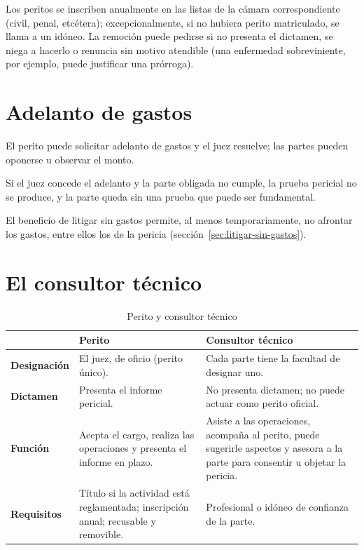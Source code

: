 \documentclass[12pt,oneside]{book}
\begin{document}
Los peritos se inscriben anualmente en las listas de la cámara correspondiente (civil, penal, etcétera); excepcionalmente, si no hubiera perito matriculado, se llama a un idóneo. La remoción puede pedirse si no presenta el dictamen, se niega a hacerlo o renuncia sin motivo atendible (una enfermedad sobreviniente, por ejemplo, puede justificar una prórroga).

\section{Adelanto de gastos}

El perito puede solicitar adelanto de gastos y el juez resuelve; las partes pueden oponerse u observar el monto.

\begin{importante}
Si el juez concede el adelanto y la parte obligada no cumple, la prueba pericial no se produce, y la parte queda sin una prueba que puede ser fundamental.
\end{importante}

El beneficio de litigar sin gastos permite, al menos temporariamente, no afrontar los gastos, entre ellos los de la pericia (sección~\ref{sec:litigar-sin-gastos}).

\section{El consultor técnico}

\begin{table}[H]
\centering
\caption{Perito y consultor técnico}
\begin{tabularx}{\textwidth}{>{\raggedright\arraybackslash\bfseries}p{} X X}
\toprule
 & Perito & Consultor técnico \\
\midrule
Designación & El juez, de oficio (perito único). & Cada parte tiene la facultad de designar uno. \\
Dictamen & Presenta el informe pericial. & No presenta dictamen; no puede actuar como perito oficial. \\
Función & Acepta el cargo, realiza las operaciones y presenta el informe en plazo. & Asiste a las operaciones, acompaña al perito, puede sugerirle aspectos y asesora a la parte para consentir u objetar la pericia. \\
Requisitos & Título si la actividad está reglamentada; inscripción anual; recusable y removible. & Profesional o idóneo de confianza de la parte. \\
\bottomrule
\end{tabularx}
\end{table}
\end{document}
